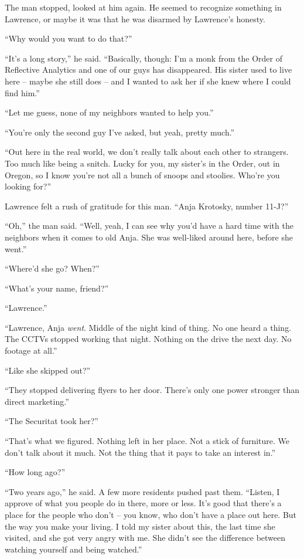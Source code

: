 The man stopped, looked at him again. He seemed to recognize something 
in Lawrence, or maybe it was that he was disarmed by Lawrence's honesty.

“Why would you want to do that?”

“It's a long story,” he said. “Basically, though: I'm a monk from 
the Order of Reflective Analytics and one of our guys has disappeared. 
His sister used to live here -- maybe she still does -- and I wanted to 
ask her if she knew where I could find him.”

“Let me guess, none of my neighbors wanted to help you.”

“You're only the second guy I've asked, but yeah, pretty much.”

“Out here in the real world, we don't really talk about each other to 
strangers. Too much like being a snitch. Lucky for you, my sister's in 
the Order, out in Oregon, so I know you're not all a bunch of snoops 
and stoolies. Who're you looking for?”

Lawrence felt a rush of gratitude for this man. “Anja Krotosky, 
number 11-J?”

“Oh,” the man said. “Well, yeah, I can see why you'd have a hard 
time with the neighbors when it comes to old Anja. She was well-liked 
around here, before she went.”

“Where'd she go? When?”

“What's your name, friend?”

“Lawrence.”

“Lawrence, Anja \emph{went}. Middle of the night kind of thing. No 
one heard a thing. The CCTVs stopped working that night. Nothing on the 
drive the next day. No footage at all.”

“Like she skipped out?”

“They stopped delivering flyers to her door. There's only one power 
stronger than direct marketing.”

“The Securitat took her?”

“That's what we figured. Nothing left in her place. Not a stick of 
furniture. We don't talk about it much. Not the thing that it pays to 
take an interest in.”

“How long ago?”

“Two years ago,” he said. A few more residents pushed past them. 
“Listen, I approve of what you people do in there, more or less. It's 
good that there's a place for the people who don't -- you know, who 
don't have a place out here. But the way you make your living. I told 
my sister about this, the last time she visited, and she got very angry 
with me. She didn't see the difference between watching yourself and 
being watched.”

